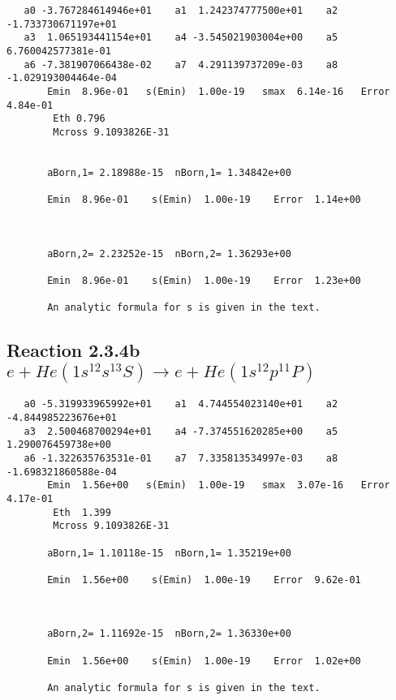 \documentclass[12pt,dvipdfmx]{article}
\begin{document}
\begin{small}\begin{verbatim}
   a0 -3.767284614946e+01    a1  1.242374777500e+01    a2 -1.733730671197e+01
   a3  1.065193441154e+01    a4 -3.545021903004e+00    a5  6.760042577381e-01
   a6 -7.381907066438e-02    a7  4.291139737209e-03    a8 -1.029193004464e-04
       Emin  8.96e-01   s(Emin)  1.00e-19   smax  6.14e-16   Error  4.84e-01
        Eth 0.796
        Mcross 9.1093826E-31


       aBorn,1= 2.18988e-15  nBorn,1= 1.34842e+00

       Emin  8.96e-01    s(Emin)  1.00e-19    Error  1.14e+00



       aBorn,2= 2.23252e-15  nBorn,2= 1.36293e+00

       Emin  8.96e-01    s(Emin)  1.00e-19    Error  1.23e+00

       An analytic formula for s is given in the text.
\end{verbatim}\end{small}







\newpage
\subsection{
Reaction 2.3.4b $e + He(1s^12s^13S) \rightarrow e + He(1s^12p^11P)$}

















\begin{small}\begin{verbatim}
   a0 -5.319933965992e+01    a1  4.744554023140e+01    a2 -4.844985223676e+01
   a3  2.500468700294e+01    a4 -7.374551620285e+00    a5  1.290076459738e+00
   a6 -1.322635763531e-01    a7  7.335813534997e-03    a8 -1.698321860588e-04
       Emin  1.56e+00   s(Emin)  1.00e-19   smax  3.07e-16   Error  4.17e-01
        Eth  1.399
        Mcross 9.1093826E-31

       aBorn,1= 1.10118e-15  nBorn,1= 1.35219e+00

       Emin  1.56e+00    s(Emin)  1.00e-19    Error  9.62e-01



       aBorn,2= 1.11692e-15  nBorn,2= 1.36330e+00

       Emin  1.56e+00    s(Emin)  1.00e-19    Error  1.02e+00

       An analytic formula for s is given in the text.
\end{verbatim}\end{small}
\end{document}
